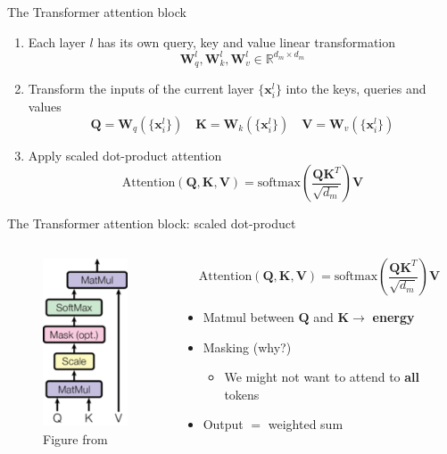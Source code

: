 \documentclass[12pt,aspectratio=169,handout]{beamer}
\begin{document}
\begin{frame}{The Transformer attention block}

	\begin{enumerate}
		\item Each layer $l$ has its own query, key and value linear transformation 
		$$
			\bm{W}^l_q, \bm{W}^l_k, \bm{W}^l_v \in \mathbb{R}^{d_m \times d_m}
		$$
		\pause
		\item Transform the inputs of the current layer $\{\bm{x}^l_i\}$ into the keys, queries and values
		$$
		\bm{Q} = \bm{W}_q (\{\bm{x}^l_i\}) \quad \bm{K} = \bm{W}_k (\{\bm{x}^l_i\}) \quad \bm{V} = \bm{W}_v (\{\bm{x}^l_i\})
		$$
		\pause
		\item Apply scaled dot-product attention
		$$
		\text{Attention} (\bm{Q},\bm{K},\bm{V}) = \text{softmax} \left( \frac{\bm{Q}\bm{K}^T}{\sqrt{d_m}}\right) \bm{V}
		$$

	\end{enumerate}


\end{frame}


\begin{frame}{The Transformer attention block: scaled dot-product}
	\begin{columns}[T] %
	
		\begin{column}{.48\textwidth}
	
		\begin{figure}[h]
			\includegraphics[height=5cm]{anno_transformer_attn_block}
			\caption*{Figure from \cite{Vaswani.et.al.2017}}
		\end{figure}
		\end{column}
	
		\begin{column}{.48\textwidth}
			$$
				\text{Attention} (\bm{Q},\bm{K},\bm{V}) = \text{softmax} \left( \frac{\bm{Q}\bm{K}^T}{\sqrt{d_m}} \right) \bm{V}
			$$
			\pause
			\begin{itemize}
				\item Matmul between $\bm{Q}$ and $\bm{K} \to$ \textbf{energy} 
				\pause
				\item Masking (why?)
				\begin{itemize}
					\item We might not want to attend to \textbf{all} tokens
				\end{itemize}
				\pause
				\item Output $=$ weighted sum
			\end{itemize}
		\end{column}
	
	\end{columns}
	
\end{frame}
\end{document}
